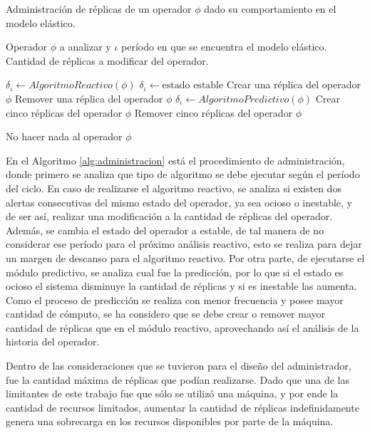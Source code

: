 \begin{algorithm}[!ht]
	\caption{Administración de réplicas de un operador $\phi$ dado su comportamiento en el modelo elástico.}
	\label{alg:administracion}
	\begin{algorithmic}[1]
	\REQUIRE Operador $\phi$ a analizar y $\iota$ período en que se encuentra el modelo elástico.
	\ENSURE Cantidad de réplicas a modificar del operador.	
	
		\STATE $\delta_{\iota} \leftarrow AlgoritmoReactivo(\phi)$
				\STATE $\delta_{\iota} \leftarrow \text{estado estable}$ 
				\RETURN Crear una réplica del operador $\phi$
			\ENDIF
			\RETURN Remover una réplica del operador $\phi$
		\ENDIF 
	\ELSE
		\STATE $\delta_{\iota} \leftarrow AlgoritmoPredictivo(\phi)$
				\RETURN Crear cinco réplicas del operador $\phi$
			\ENDIF
			\RETURN Remover cinco réplicas del operador $\phi$
		\ENDIF
	\ENDIF
	
	\RETURN No hacer nada al operador $\phi$
	
	\end{algorithmic}
\end{algorithm}

En el Algoritmo \ref{alg:administracion} está el procedimiento de administración, donde primero se analiza que tipo de algoritmo se debe ejecutar según el período del ciclo. En caso de realizarse el algoritmo reactivo, se analiza si existen dos alertas consecutivas del mismo estado del operador, ya sea ocioso o inestable, y de ser así, realizar una modificación a la cantidad de réplicas del operador. Además, se cambia el estado del operador a estable, de tal manera de no considerar ese período para el próximo análisis reactivo, esto se realiza para dejar un margen de descanso para el algoritmo reactivo. Por otra parte, de ejecutarse el módulo predictivo, se analiza cual fue la predicción, por lo que si el estado es ocioso el sistema disminuye la cantidad de réplicas y si es inestable las aumenta. Como el proceso de predicción se realiza con menor frecuencia y posee mayor cantidad de cómputo, se ha considero que se debe crear o remover mayor cantidad de réplicas que en el módulo reactivo, aprovechando así el análisis de la historia del operador.

Dentro de las consideraciones que se tuvieron para el diseño del administrador, fue la cantidad máxima de réplicas que podían realizarse. Dado que una de las limitantes de este trabajo fue que sólo se utilizó una máquina, y por ende la cantidad de recursos limitados, aumentar la cantidad de réplicas indefinidamente genera una sobrecarga en los recursos disponibles por parte de la máquina.